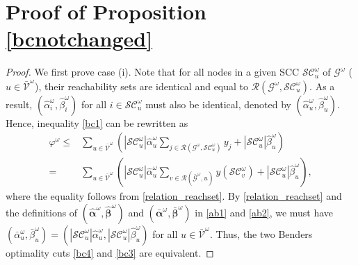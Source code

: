 \documentclass[a4paper,10pt]{article}
\newcommand{\G}{\mathcal{G}}
\theoremstyle{plain}
\newcommand{\revv}[1]{{#1}}
\begin{document}
	\section{}
	\label{proof_scna_BD}
	\section*{Proof of Proposition \ref{bcnotchanged}}
	
	\begin{proof}
		\revv{We first prove case (i).
			Note that for all nodes in a given SCC $\mathcal{SC}_u^{\omega}$ of $\G^{\omega}$ ($u \in \bar{\mathcal{V}}^\omega$), their reachability sets are identical and equal to $\mathcal{R}(\mathcal{G}^\omega,\mathcal{SC}_u^{\omega})$.
			As a result,  $(\hat{\alpha}_{i}^{\omega},
			\hat{\beta}_{i}^{\omega})$ for all $i \in \mathcal{SC}_u^{\omega}$ must also be identical, denoted by $(\hat{\alpha}_{u}^{\omega},\hat{\beta}_{u}^{\omega})$. 
			Hence, inequality \eqref{bc1} can be rewritten as
			\begin{equation}\label{bc3}
				\begin{aligned}
					\varphi^{\omega} \leq& \sum_{u\in\bar{\mathcal{V}}^{\omega}} \left(|\mathcal{SC}_u^{\omega}|\hat{\alpha}_{u}^{\omega}\sum_{j\in\mathcal{R}(\mathcal{G}^\omega,\mathcal{SC}_u^{\omega})}y_j+|\mathcal{SC}_u^{\omega}|\hat{\beta}_{u}^{\omega}\right)\\ 
					=&\sum_{u\in\bar{\mathcal{V}}^{\omega}}\left(|\mathcal{SC}_u^{\omega}|\hat{\alpha}_{u}^{\omega}\sum_{v\in\mathcal{R}(\bar{\mathcal{G}}^\omega,u)} y(\mathcal{SC}_v^\omega)+|\mathcal{SC}_u^{\omega}|\hat{\beta}_{u}^{\omega}\right),
				\end{aligned}
			\end{equation}
			where the equality follows from \eqref{relation_reachset}.
			By \eqref{relation_reachset} and the definitions of  $(\hat{\boldsymbol{\alpha}}^{\omega},\hat{\boldsymbol{\beta}}^{\omega})$ and $(\bar{\boldsymbol{\alpha}}^{\omega},\bar{\boldsymbol{\beta}}^{\omega})$ in \eqref{ab1} and \eqref{ab2}, we must have  $(\bar{\alpha}_u^{\omega},\bar{\beta}_u^{\omega})=(|\mathcal{SC}_u^{\omega}|\hat{\alpha}_{u}^{\omega},|\mathcal{SC}_u^{\omega}|\hat{\beta}_{u}^{\omega})$ for all $u \in \bar{\mathcal{V}}^\omega$.
			Thus, the two Benders optimality cuts \eqref{bc4} and \eqref{bc3} are equivalent.}
		
		
		

\end{proof}
\end{document}

